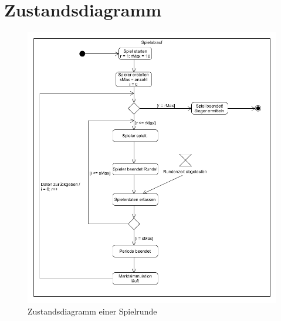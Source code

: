 \section{Zustandsdiagramm}
\begin{figure} [!h]
	\centering
	\includegraphics[scale=0.5]{img/Spielablauf.png} 
	\caption{Zustandsdiagramm einer Spielrunde} \label{fig:zustandsdiagramm}
\end{figure}





